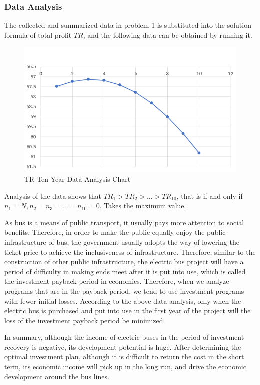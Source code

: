 \documentclass[12pt]{article}
\begin{document}
\subsubsection{Data Analysis}
The collected and summarized data in problem 1 is substituted into the solution formula of total profit $TR$, and the following 
data can be obtained by running it.
\begin{figure}[H]
	\centering
	\includegraphics[scale=0.7]{data.png}%
	\caption{TR Ten Year Data Analysis Chart} %
\end{figure}
Analysis of the data shows that $TR_1>TR_2>\ldots>TR_{10}$, that is if and only if $n_1=N, n_2=n_3=\ldots= n_{10}=0$. Takes the maximum value.

As bus is a means of public transport, it usually pays more attention to social benefits. Therefore, in order to make the public 
equally enjoy the public infrastructure of bus, the government usually adopts the way of lowering the ticket price to achieve the 
inclusiveness of infrastructure. Therefore, similar to the construction of other public infrastructure, the electric bus project will 
have a period of difficulty in making ends meet after it is put into use, which is called the investment payback period in economics. 
Therefore, when we analyze programs that are in the payback period, we tend to use investment programs with fewer initial losses. 
According to the above data analysis, only when the electric bus is purchased and put into use in the first year of the project will 
the loss of the investment payback period be minimized.

In summary, although the income of electric buses in the period of investment recovery is negative, its development potential is 
huge. After determining the optimal investment plan, although it is difficult to return the cost in the short term, its economic 
income will pick up in the long run, and drive the economic development around the bus lines.
\end{document}
